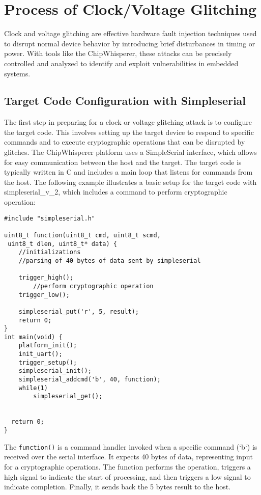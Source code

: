 \section{Process of Clock/Voltage Glitching}

Clock and voltage glitching are effective hardware fault injection techniques used to disrupt normal device behavior by introducing brief disturbances in timing or power. With tools like the ChipWhisperer, these attacks can be precisely controlled and analyzed to identify and exploit vulnerabilities in embedded systems.

\subsection{Target Code Configuration with Simpleserial}
The first step in preparing for a clock or voltage glitching attack is to configure the target code. This involves setting up the target device to respond to specific commands and to execute cryptographic operations that can be disrupted by glitches. The ChipWhisperer platform uses a SimpleSerial interface, which allows for easy communication between the host and the target.
The target code is typically written in C and includes a main loop that listens for commands from the host. The following example illustrates a basic setup for the target code with simpleserial\_v\_{2}, which includes a command to perform cryptographic operation:
\begin{verbatim}
#include "simpleserial.h"

uint8_t function(uint8_t cmd, uint8_t scmd,
 uint8_t dlen, uint8_t* data) {
    //initializations
    //parsing of 40 bytes of data sent by simpleserial

    trigger_high();
        //perform cryptographic operation
    trigger_low();
    
    simpleserial_put('r', 5, result);
    return 0;
}
int main(void) {
    platform_init();
    init_uart();
    trigger_setup();
	simpleserial_init();
    simpleserial_addcmd('b', 40, function);
    while(1)
        simpleserial_get();
    

  return 0;
}
\end{verbatim}
The \texttt{function()} is a command handler invoked when a specific command (`b`) is received over the serial interface. It expects 40 bytes of data, representing input for a cryptographic operations. The function performs the operation, triggers a high signal to indicate the start of processing, and then triggers a low signal to indicate completion. Finally, it sends back the 5 bytes result to the host.


